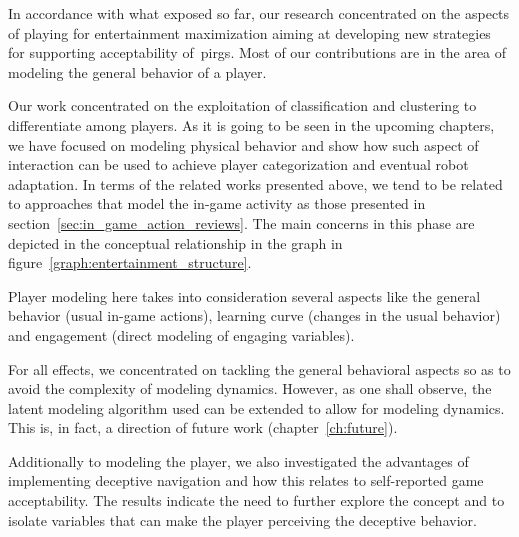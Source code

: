 In accordance with what exposed so far, our research concentrated on the aspects of playing for entertainment maximization aiming at developing new strategies for supporting acceptability of~\glspl{pirg}. Most of our contributions are in the area of modeling the general behavior of a player. 

Our work concentrated on the exploitation of classification and clustering to differentiate among players. As it is going to be seen in the upcoming chapters, we have focused on modeling physical behavior and show how such aspect of interaction can be used to achieve player categorization and eventual robot adaptation. In terms of the related works presented above, we tend to be related to approaches that model the in-game activity as those presented in section~\ref{sec:in_game_action_reviews}. The main concerns in this phase are depicted in the conceptual relationship in the graph in figure~\ref{graph:entertainment_structure}. %



Player modeling here takes into consideration several aspects like the general behavior (usual in-game actions), learning curve (changes in the usual behavior) and engagement (direct modeling of engaging variables). 

For all effects, we concentrated on tackling the general behavioral aspects so as to avoid the complexity of modeling dynamics. However, as one shall observe, the latent modeling algorithm used can be extended to allow for modeling dynamics. This is, in fact, a direction of future work (chapter~\ref{ch:future}).

Additionally to modeling the player, we also investigated the advantages of implementing deceptive navigation and how this relates to self-reported game acceptability. The results indicate the need to further explore the concept and to isolate variables that can make the player perceiving the deceptive behavior. 